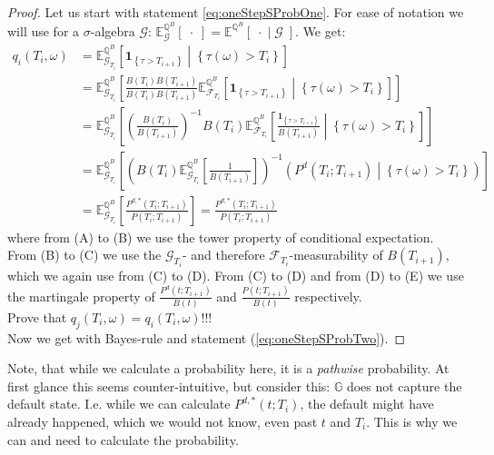 \documentclass[12pt]{article}
\begin{document}
	\begin{proof}
		Let us start with statement \ref{eq:oneStepSProbOne}. For ease of notation we will use for a $\sigma$-algebra $\mathcal{G}$: $\mathbb{E}^{\mathbb{Q}^B}_{\mathcal{G}}\left[ \; \cdot \; \right]=  \mathbb{E}^{\mathbb{Q}^B}\left[ \; \cdot \; | \; \mathcal{G} \; \right]$. We get:
		\begin{align*}
			q_i(T_i, \omega) &= \mathbb{E}^{\mathbb{Q}^B}_{\mathcal{G}_{T_i}}\left[ \left.\mathbf{1}_{\left\{ \tau > T_{i+1}\right\}}   \;\right|\; \left\{\tau(\omega) > T_{i} \right\} \right]
			\tag{A}\\
			&= \mathbb{E}^{\mathbb{Q}^B}_{\mathcal{G}_{T_i}}\left[
			\frac{B(T_i)B(T_{i+1})}{B(T_i)B(T_{i+1})} \mathbb{E}^{\mathbb{Q}^B}_{\mathcal{F}_{T_i}}\left[ \left.\mathbf{1}_{\left\{ \tau > T_{i+1}\right\}}   \;\right|\; \left\{\tau(\omega) > T_{i} \right\} \right]\right]
			\tag{B}\\
			&= \mathbb{E}^{\mathbb{Q}^B}_{\mathcal{G}_{T_i}}\left[\left( \frac{B(T_i)}{B(T_{i+1})}\right)^{-1} B(T_i)
			\mathbb{E}^{\mathbb{Q}^B}_{\mathcal{F}_{T_i}}\left[ \left.\frac{\mathbf{1}_{\left\{ \tau > T_{i+1}\right\}}}{B(T_{i+1})}   \;\right|\; \left\{\tau(\omega) > T_{i} \right\} \right] \right]
			\tag{C}\\
			&=\mathbb{E}^{\mathbb{Q}^B}_{\mathcal{G}_{T_i}}\left[\left( B(T_i)\mathbb{E}^{\mathbb{Q}^B}_{\mathcal{G}_{T_i}}\left[\frac{1}{B(T_{i+1})}\right]\right)^{-1} \left( \left. P^d(T_i;T_{i+1})\; \right| \; \left\{\tau(\omega) > T_{i} \right\} \right)\right]
			\tag{D}\\
			&=\mathbb{E}^{\mathbb{Q}^B}_{\mathcal{G}_{T_i}}\left[\frac{P^{d,*}(T_i;T_{i+1})}{P(T_i;T_{i+1})}\right] = \frac{P^{d,*}(T_i;T_{i+1})}{P(T_i;T_{i+1})}
			\tag{E}
		\end{align*}
		where from (A) to (B) we use the tower property of conditional expectation. From (B) to (C) we use the $\mathcal{G}_{T_{i}}$- and therefore $\mathcal{F}_{T_{i}}$-measurability of $B(T_{i+1})$, which we again use from (C) to (D). From (C) to (D) and from (D) to (E) we use the martingale property of $\frac{P^d(t; T_{i+1})}{B(t)}$ and $\frac{P(t; T_{i+1})}{B(t)}$ respectively.\\
		\color{red}Prove that $q_j(T_i, \omega)=q_i(T_i, \omega)$!!!\color{black}\\
		Now we get  with Bayes-rule and statement (\ref{eq:oneStepSProbTwo}).
	\end{proof}
	Note, that while we calculate a probability here, it is a \emph{pathwise} probability. At first glance this seems counter-intuitive, but consider this: $\mathbb{G}$ does not capture the default state. I.e. while we can calculate $P^{d,*}(t;T_i)$, the default might have already happened, which we would not know, even past $t$ and $T_i$. This is why we can and need to calculate the probability.\\
\end{document}
